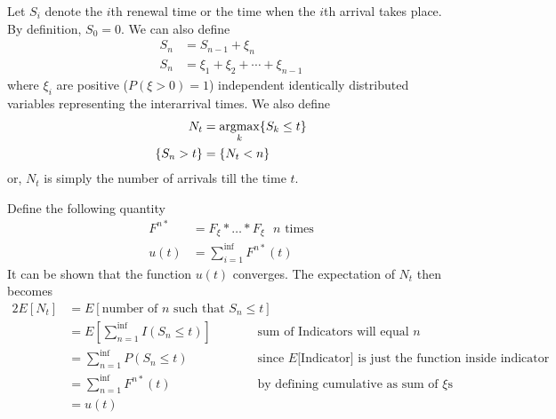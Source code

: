 \documentclass[../probability-notes.tex]{subfiles}
\begin{document}
    Let $S_{i}$ denote the $i$th renewal time or the time when the $i$th arrival takes place. By definition, $S_{0} = 0$. We can also define
    \begin{align*}
        S_{n} &= S_{n-1} + \xi_{n}\\
        S_{n} &= \xi_{1} + \xi_{2} + \cdots + \xi_{n-1}
    \end{align*}
    where $\xi_{i}$ are positive ($P(\xi > 0) = 1$) independent identically distributed variables representing the interarrival times. We also define
    \begin{align*}
        N_{t} &= \operatorname*{argmax}_{k} \{ S_{k} \leq t \}\\
        \{ S_{n} > t \} &= \{ N_{t} < n \}
    \end{align*}
    or, $N_{t}$ is simply the number of arrivals till the time $t$.\newline

    Define the following quantity
    \begin{align*}
        F^{n*} &= F_{\xi} * \ldots * F_{\xi} \text{ $n$ times}\\
        u(t) &= \sum_{i=1}^{\inf} F^{n*}(t)
    \end{align*}
    It can be shown that the function $u(t)$ converges. The expectation of $N_{t}$ then becomes
    \begin{alignat*}{2}
        E[N_{t}] &= E[\text{number of $n$ such that $S_{n} \leq t$}]\\
        &= E[\sum_{n=1}^{\inf} I(S_{n} \leq t)] &\text{ sum of Indicators will equal $n$}\\
        &= \sum_{n=1}^{\inf} P(S_{n} \leq t) &\text{ since $E[$Indicator$]$ is just the function inside indicator}\\
        &= \sum_{n=1}^{\inf} F^{n*}(t) &\text{ by defining cumulative as sum of $\xi$s}\\
        &= u(t)
    \end{alignat*}
\end{document}
